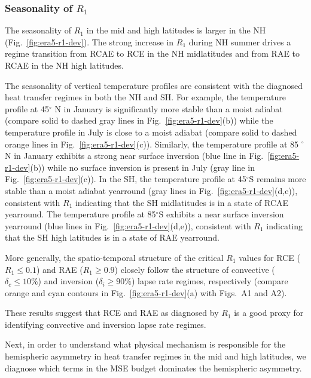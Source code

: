 \documentclass{ametsocV5}
\begin{document}
    \subsubsection{Seasonality of $R_1$}
    The seasonality of \(R_{1}\) in the mid and high latitudes is larger in the NH (Fig.~\ref{fig:era5-r1-dev}). The strong increase in \(R_{1}\) during NH summer drives a regime transition from RCAE to RCE in the NH midlatitudes and from RAE to RCAE in the NH high latitudes.
  
    The seasonality of vertical temperature profiles are consistent with the diagnosed heat transfer regimes in both the NH and SH. For example, the temperature profile at 45$^{\circ}$ N in January is significantly more stable than a moist adiabat (compare solid to dashed gray lines in Fig.~\ref{fig:era5-r1-dev}(b)) while the temperature profile in July is close to a moist adiabat (compare solid to dashed orange lines in Fig.~\ref{fig:era5-r1-dev}(c)). Similarly, the temperature profile at 85 $^{\circ}$ N in January exhibits a strong near surface inversion (blue line in Fig.~\ref{fig:era5-r1-dev}(b)) while no surface inversion is present in July (gray line in Fig.~\ref{fig:era5-r1-dev}(c)). In the SH, the temperature profile at 45$^{\circ}$S remains more stable than a moist adiabat yearround (gray lines in Fig.~\ref{fig:era5-r1-dev}(d,e)), consistent with $R_{1}$ indicating that the SH midlatitudes is in a state of RCAE yearround. The temperature profile at 85$^{\circ}$S exhibits a near surface inversion yearround (blue lines in Fig.~\ref{fig:era5-r1-dev}(d,e)), consistent with $R_{1}$ indicating that the SH high latitudes is in a state of RAE yearround.
    
    More generally, the spatio-temporal structure of the critical \(R_{1}\) values for RCE (\(R_{1}\le 0.1\)) and RAE (\(R_{1}\ge 0.9\)) closely follow the structure of convective (\(\delta_{c}\le 10\%\)) and inversion (\(\delta_{i}\ge 90\%\)) lapse rate regimes, respectively (compare orange and cyan contours in Fig.~\ref{fig:era5-r1-dev}(a) with Figs.~A1 and A2).
    
    These results suggest that RCE and RAE as diagnosed by \(R_{1}\) is a good proxy for identifying convective and inversion lapse rate regimes.
    
    Next, in order to understand what physical mechanism is responsible for the hemispheric asymmetry in heat transfer regimes in the mid and high latitudes, we diagnose which terms in the MSE budget dominates the hemispheric asymmetry.
\end{document}

